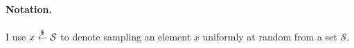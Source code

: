 \paragraph{Notation.} %
I use $x \stackrel{\$}{\gets} \mathcal{S}$ to denote sampling an element $x$ uniformly at random from a set $\mathcal{S}$.





